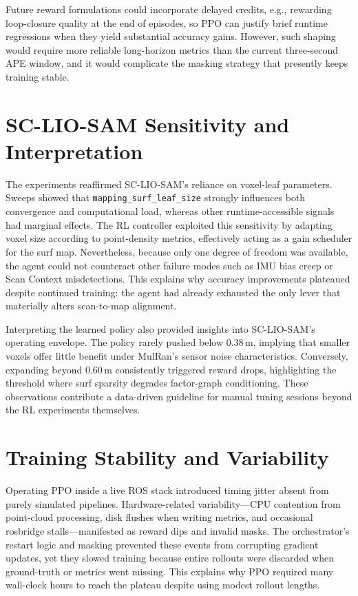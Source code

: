 Future reward formulations could incorporate delayed credits, e.g., rewarding loop-closure quality at the end of episodes, so PPO can justify brief runtime regressions when they yield substantial accuracy gains. However, such shaping would require more reliable long-horizon metrics than the current three-second APE window, and it would complicate the masking strategy that presently keeps training stable.

\section{SC-LIO-SAM Sensitivity and Interpretation}
The experiments reaffirmed SC-LIO-SAM’s reliance on voxel-leaf parameters. Sweeps showed that \texttt{mapping\_surf\_leaf\_size} strongly influences both convergence and computational load, whereas other runtime-accessible signals had marginal effects. The RL controller exploited this sensitivity by adapting voxel size according to point-density metrics, effectively acting as a gain scheduler for the surf map. Nevertheless, because only one degree of freedom was available, the agent could not counteract other failure modes such as IMU bias creep or Scan Context misdetections. This explains why accuracy improvements plateaued despite continued training: the agent had already exhausted the only lever that materially alters scan-to-map alignment.

Interpreting the learned policy also provided insights into SC-LIO-SAM’s operating envelope. The policy rarely pushed below $0.38$\,m, implying that smaller voxels offer little benefit under MulRan’s sensor noise characteristics. Conversely, expanding beyond $0.60$\,m consistently triggered reward drops, highlighting the threshold where surf sparsity degrades factor-graph conditioning. These observations contribute a data-driven guideline for manual tuning sessions beyond the RL experiments themselves.

\section{Training Stability and Variability}
Operating PPO inside a live ROS stack introduced timing jitter absent from purely simulated pipelines. Hardware-related variability—CPU contention from point-cloud processing, disk flushes when writing metrics, and occasional rosbridge stalls—manifested as reward dips and invalid masks. The orchestrator’s restart logic and masking prevented these events from corrupting gradient updates, yet they slowed training because entire rollouts were discarded when ground-truth or metrics went missing. This explains why PPO required many wall-clock hours to reach the plateau despite using modest rollout lengths.

